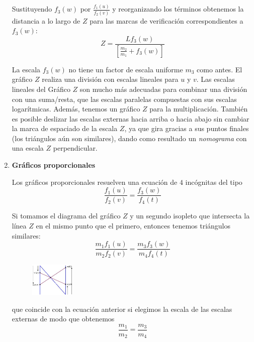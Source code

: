 \documentclass[letterpaper,11pt]{article}
\begin{document}
\begin{enumerate}
    Sustituyendo $f_{3} (w)$ por $\frac{f_{1} (u)}{f_{2} (v)}$ y reorganizando
    los términos obtenemos la distancia a lo largo de $Z$ para las marcas de 
    verificación correspondientes a $f_{3} (w)$:
    \begin{equation*}
        Z = \frac{L f_{3} (w)}{[\frac{m_{2}}{m_{1}} + f_{3} (w)]}
    \end{equation*}

    La escala $f_{3} (w)$ no tiene un factor de escala uniforme $m_{3}$ como 
    antes. El gráfico $Z$ realiza una división con escalas lineales para $u$ y
    $v$. Las escalas lineales del Gráfico $Z$ son mucho más adecuadas para 
    combinar una división con una suma/resta, que las escalas paralelas 
    compuestas con sus escalas logarítmicas. Además, tenemos un  gráfico $Z$ 
    para la multiplicación. También es posible deslizar las escalas externas 
    hacia arriba o hacia abajo sin cambiar la marca de espaciado de la 
    escala $Z$, ya que gira gracias a sus puntos finales (los triángulos 
    aún son similares), dando como resultado un \textit{nomograma} con una 
    escala $Z$ perpendicular. 

    \item \textbf{Gráficos proporcionales}
    
    Los gráficos proporcionales resuelven una ecuación de $4$ incógnitas del 
    tipo 
    \begin{equation*}
        \frac{f_{1} (u)}{f_{2} (v)} = \frac{f_{3} (w)}{f_{4} (t)}
    \end{equation*}

    Si tomamos el diagrama del gráfico $Z$ y un segundo isopleto que 
    intersecta la línea $Z$ en el mismo punto que el primero, entonces tenemos
    triángulos similares:
    \begin{equation*}
        \frac{m_1 f_{1} (u)}{m_2 f_{2} (v)} = 
        \frac{m_{3} f_{3} (w)}{m_{4} f_{4} (t)}
    \end{equation*}

    \begin{figure}[htb]
        \centering
        \includegraphics[width=0.2\textwidth]{./imagenes/geometry3.jpg}
    \end{figure} 

    que coincide con la ecuación anterior si elegimos la escala de las escalas 
    externas de modo que obtenemos
    \begin{equation*}
        \frac{m_1}{m_2} = \frac{m_{3}}{m_{4}}
    \end{equation*}


\end{enumerate}
\end{document}
